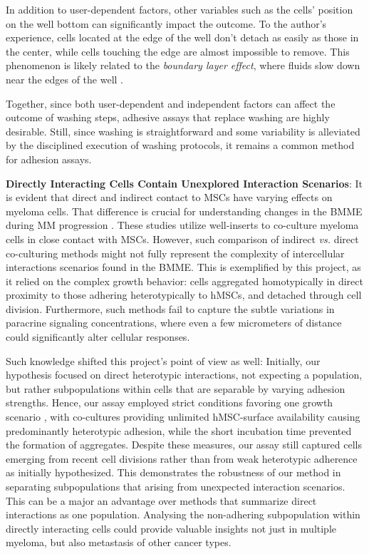 In addition to user-dependent factors, other variables such as the cells'
position on the well bottom can significantly impact the outcome. To the
author's experience, cells located at the edge of the well don't detach as
easily as those in the center, while cells touching the edge are almost
impossible to remove. This phenomenon is likely related to the \textit{boundary
      layer effect}, where fluids slow down near the edges of the well
\cite{weyburneNewThicknessShape2014}.

Together, since both user-dependent and independent factors can affect the
outcome of washing steps, adhesive assays that replace washing are highly
desirable. Still, since washing is straightforward and some variability is
alleviated by the disciplined execution of washing protocols, it remains a
common method for adhesion assays.



\textbf{Directly Interacting Cells Contain Unexplored Interaction Scenarios}: It
is evident that direct and indirect contact to \acp{MSC} have varying effects on
myeloma cells. That difference is crucial for understanding changes in the
\ac{BMME} during MM progression \cite{fairfieldMultipleMyelomaCells2020,
      dziadowiczBoneMarrowStromaInduced2022}. These studies utilize well-inserts to
co-culture myeloma cells in close  contact with MSCs. However,
such comparison of indirect \textit{vs.} direct co-culturing methods might not
fully represent the complexity of intercellular interactions
scenarios%
\footterm{\footinteractionscenario}{\label{foot:interactionscenario}}
found in the \ac{BMME}. This is exemplified by
this project, as it relied on the complex growth behavior: \INA cells aggregated
homotypically in direct proximity to those adhering heterotypically to
\acp{hMSC}, and detached through cell division. Furthermore, such methods fail
to capture the subtle variations in paracrine signaling concentrations, where
even a few micrometers of distance could significantly alter cellular responses.

Such knowledge shifted this project's point of view as well: Initially, our
hypothesis focused on direct heterotypic interactions, not expecting a \nMAina
population, but rather subpopulations within \MAina cells that are separable by
varying adhesion strengths. Hence, our assay employed strict conditions favoring
one growth scenario , with co-cultures
providing unlimited hMSC-surface availability causing predominantly heterotypic
adhesion, while the short incubation time prevented the formation of aggregates.
Despite these measures, our assay still captured cells emerging from recent cell
divisions rather than from weak heterotypic adherence as initially hypothesized.
This demonstrates the robustness of our method in separating subpopulations that
arising from unexpected interaction scenarios.
This can be a major an advantage over methods that summarize direct interactions
as one population. Analysing the non-adhering subpopulation within directly
interacting cells could provide valuable insights not just in multiple myeloma,
but also metastasis of other cancer types.


